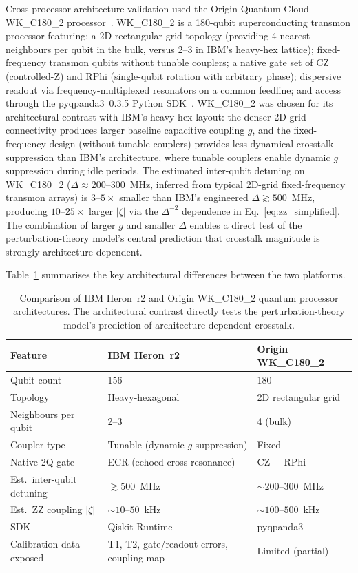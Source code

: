 \documentclass[ASNA,twocolumn]{USG}
\begin{document}
Cross-processor-architecture validation used the Origin Quantum Cloud WK\_C180\_2 processor~\cite{originqc2026}. WK\_C180\_2 is a 180-qubit superconducting transmon processor featuring: a 2D rectangular grid topology (providing 4 nearest neighbours per qubit in the bulk, versus 2--3 in IBM's heavy-hex lattice); fixed-frequency transmon qubits without tunable couplers; a native gate set of CZ (controlled-Z) and RPhi (single-qubit rotation with arbitrary phase); dispersive readout via frequency-multiplexed resonators on a common feedline; and access through the pyqpanda3~0.3.5 Python SDK~\cite{pyqpanda3}. WK\_C180\_2 was chosen for its architectural contrast with IBM's heavy-hex layout: the denser 2D-grid connectivity produces larger baseline capacitive coupling $g$, and the fixed-frequency design (without tunable couplers) provides less dynamical crosstalk suppression than IBM's architecture, where tunable couplers enable dynamic $g$ suppression during idle periods. The estimated inter-qubit detuning on WK\_C180\_2 ($\Delta \approx 200$--$300$~MHz, inferred from typical 2D-grid fixed-frequency transmon arrays) is $3$--$5\times$ smaller than IBM's engineered $\Delta \gtrsim 500$~MHz, producing $10$--$25\times$ larger $|\zeta|$ via the $\Delta^{-2}$ dependence in Eq.~\ref{eq:zz_simplified}. The combination of larger $g$ and smaller $\Delta$ enables a direct test of the perturbation-theory model's central prediction that crosstalk magnitude is strongly architecture-dependent.

Table~\ref{tab:platform_comparison} summarises the key architectural differences between the two platforms.

\begin{table}[t]
\centering
\caption{Comparison of IBM Heron~r2 and Origin WK\_C180\_2 quantum processor architectures. The architectural contrast directly tests the perturbation-theory model's prediction of architecture-dependent crosstalk.}
\label{tab:platform_comparison}
\scriptsize
\begin{tabular}{p{3.0cm}p{2.2cm}p{2.2cm}}
\toprule
Feature & IBM Heron~r2 & Origin WK\_C180\_2 \\
\midrule
Qubit count & 156 & 180 \\
Topology & Heavy-hexagonal & 2D rectangular grid \\
Neighbours per qubit & 2--3 & 4 (bulk) \\
Coupler type & Tunable (dynamic $g$ suppression) & Fixed \\
Native 2Q gate & ECR (echoed cross-resonance) & CZ $+$ RPhi \\
Est.\ inter-qubit detuning & $\gtrsim 500$~MHz & $\sim 200$--$300$~MHz \\
Est.\ ZZ coupling $|\zeta|$ & $\sim 10$--$50$~kHz & $\sim 100$--$500$~kHz \\
SDK & Qiskit Runtime & pyqpanda3 \\
Calibration data exposed & T1, T2, gate/readout errors, coupling map & Limited (partial) \\
\bottomrule
\end{tabular}
\end{table}
\end{document}
